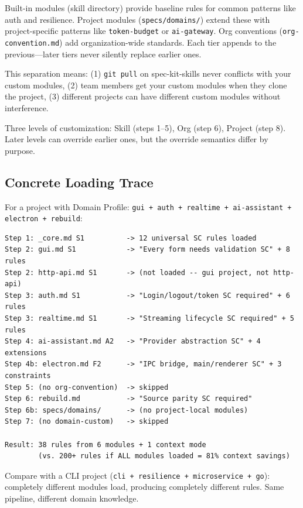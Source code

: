 \documentclass[11pt,a4paper,openright,twoside]{report}
\newcommand{\file}[1]{\texttt{#1}}
\begin{document}
\begin{tipbox}
Built-in modules (skill directory) provide baseline rules for common patterns like auth and resilience. Project modules (\file{specs/domains/}) extend these with project-specific patterns like \texttt{token-budget} or \texttt{ai-gateway}. Org conventions (\file{org-convention.md}) add organization-wide standards. Each tier appends to the previous---later tiers never silently replace earlier ones.

This separation means: (1) \texttt{git pull} on spec-kit-skills never conflicts with your custom modules, (2) team members get your custom modules when they clone the project, (3) different projects can have different custom modules without interference.
\end{tipbox}

Three levels of customization: Skill (steps 1--5), Org (step 6), Project (step 8). Later levels can override earlier ones, but the override semantics differ by purpose.

\subsection{Concrete Loading Trace}

For a project with Domain Profile: \texttt{gui + auth + realtime + ai-assistant + electron + rebuild}:

\begin{lstlisting}[title={Module Loading Trace (specify step)}]
Step 1: _core.md S1          -> 12 universal SC rules loaded
Step 2: gui.md S1            -> "Every form needs validation SC" + 8 rules
Step 2: http-api.md S1       -> (not loaded -- gui project, not http-api)
Step 3: auth.md S1           -> "Login/logout/token SC required" + 6 rules
Step 3: realtime.md S1       -> "Streaming lifecycle SC required" + 5 rules
Step 4: ai-assistant.md A2   -> "Provider abstraction SC" + 4 extensions
Step 4b: electron.md F2      -> "IPC bridge, main/renderer SC" + 3 constraints
Step 5: (no org-convention)  -> skipped
Step 6: rebuild.md           -> "Source parity SC required"
Step 6b: specs/domains/      -> (no project-local modules)
Step 7: (no domain-custom)   -> skipped

Result: 38 rules from 6 modules + 1 context mode
        (vs. 200+ rules if ALL modules loaded = 81% context savings)
\end{lstlisting}

Compare with a CLI project (\texttt{cli + resilience + microservice + go}): completely different modules load, producing completely different rules. Same pipeline, different domain knowledge.
\end{document}
